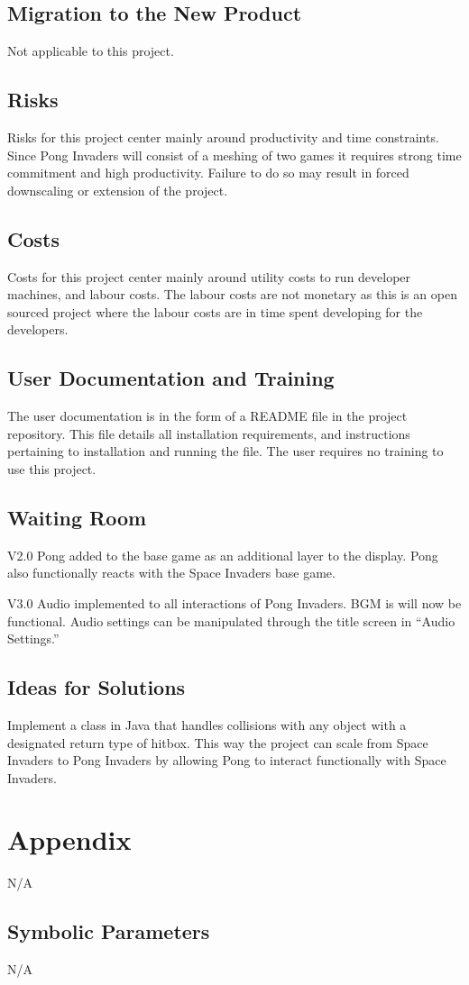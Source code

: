 \documentclass[12pt, titlepage]{article}
\begin{document}
\subsection{Migration to the New Product}
Not applicable to this project.

\subsection{Risks}
Risks for this project center mainly around productivity and time constraints. Since Pong Invaders will consist of a meshing of two games it requires strong time commitment and high productivity. Failure to do so may result in forced downscaling or extension of the project. 

\subsection{Costs}
Costs for this project center mainly around utility costs to run developer machines, and labour costs. The labour costs are not monetary as this is an open sourced project where the labour costs are in time spent developing for the developers.

\subsection{User Documentation and Training}
The user documentation is in the form of a README file in the project repository. This file details all installation requirements, and instructions pertaining to installation and running the file. The user requires no training to use this project.

\subsection{Waiting Room}
V2.0 Pong added to the base game as an additional layer to the display. Pong also functionally reacts with the Space Invaders base game.

V3.0 Audio implemented to all interactions of Pong Invaders. BGM is will now be functional. Audio settings can be manipulated through the title screen in “Audio Settings.”

\subsection{Ideas for Solutions}
Implement a class in Java that handles collisions with any object with a designated return type of hitbox. This way the project can scale from Space Invaders to Pong Invaders by allowing Pong to interact functionally with Space Invaders.



\newpage
\section{Appendix}
N/A
\subsection{Symbolic Parameters}
N/A
\end{document}
